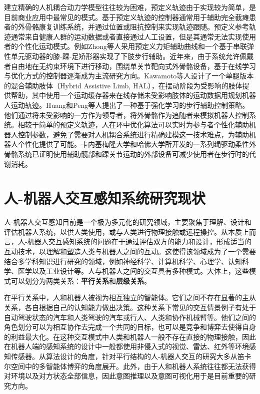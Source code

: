 建立精确的人机耦合动力学模型往往较为困难，预定义轨迹由于实现较为简单，是目前商业应用中最常见的模式。基于预定义轨迹的控制器通常用于辅助完全截瘫患者的外骨骼康复训练系统，并通过位置或阻抗控制来实现轨迹跟随。预定义参考轨迹通常来自健康人群的运动数据或者直接通过人工设置，但是其通常无法实现使用者的个性化运动模式。例如Zhong等人\cite{zhongGaitSymmetryEnhancement2022}采用预定义力矩辅助曲线和一个基于串联弹性单元驱动器的膝-踝-足矫形器实现了下肢步行辅助。近年来，由于系统允许佩戴者自由地在无约束环境下进行移动，围绕单关节靶向式外骨骼设备，基于在线学习与优化方式的控制器逐渐成为主流研究方向。Kawamoto等人\cite{kawamotoModificationHemiplegicCompensatory2015,kawamotoDevelopmentAssistController2014a}设计了一个单腿版本的混合辅助肢体（Hybrid Assistive Limb, HAL），在摆动阶段为受影响的肢体提供帮助，其中使用一个运动缓存器来在线存储未受影响肢体的运动数据用规划机器人运动轨迹。Huang和Peng等人\cite{huangLearningbasedWalkingAssistance2018,pengDataDrivenReinforcementLearning2020}提出了一种基于强化学习的步行辅助控制策略。他们通过将未受影响的一方作为领导者，将外骨骼作为追随者来模拟机器人控制系统。相较于简单的预定义轨迹，人在环中优化算法可以实时为参与者个性化辅助机器人控制参数，避免了需要对人机耦合系统进行精确建模这一技术难点，为辅助机器人个性化提供了可能。卡内基梅隆大学和哈佛大学\cite{dingHumanintheloopOptimizationHip2018,zhangHumanintheloopOptimizationExoskeleton2017a,awadSoftRoboticExosuit2017}所开发的一系列绳驱动柔性外骨骼系统已证明使用辅助髋部和踝关节运动的外部设备可减少使用者在步行时的代谢消耗。

\section{人-机器人交互感知系统研究现状}
人-机器人交互感知目前是一个极为多元化的研究领域，主要聚焦于理解、设计和评估机器人系统，以供人类使用，或与人类进行物理接触或远程操控。从本质上而言，人-机器人交互感知系统的问题在于通过评估双方的能力和设计，形成适当的互动技术，以理解和塑造人类与机器人之间的互动。这使得该领域成为了一个需要结合多学科知识进行研究的领域，例如神经科学、计算机科学、心理学、认知科学、医学以及工业设计等\cite{mohebbiHumanRobotInteractionRehabilitation2020a}。人与机器人之间的交互具有多种模式。大体上，这些模式可以划分为两类关系：\textbf{平行关系}和\textbf{层级关系}\cite{liuDesigningRobotBehavior}。

在平行关系中，人和机器人被视为相互独立的智能体。它们之间不存在显著的主从关系，各自根据自己的认知能力做出决策。这种关系下常见的交互情景例子有处于自动驾驶状态的汽车和人类驾驶的汽车或行人、人类和协作机械臂等。他们之间的角色划分可以为相互协作去完成一个共同的目标，也可以是竞争和博弈去使得自身的利益最大化。在这种交互模式中人类和机器人一般不存在直接的物理接触，因此在机器人端的感知系统的设计中一般都使用非侵入式的视觉、雷达、红外等环境感知传感器。从算法设计的角度，针对平行结构的人-机器人交互的研究大多从笛卡尔空间中的多智能体博弈的角度展开。此外，由于人和机器人系统往往都无法获得对环境以及对方状态全部信息，因此意图推理\cite{fangBehavioralIntentionPrediction2023}以及意图可视化\cite{szafirConnectingHumanRobotInteraction2021}用于是目前重要的研究方向。

